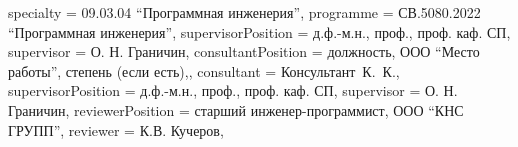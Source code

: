 {    specialty          = {09.03.04 \enquote{Программная инженерия}},
    programme          = {СВ.5080.2022 \enquote{Программная инженерия}},
    supervisorPosition = {д.ф.-м.н., проф., проф. каф. СП},
    supervisor         = {О. Н. Граничин},
    consultantPosition = {должность, ООО \enquote{Место работы}, степень  (если есть),},
    consultant         = {Консультант~К.~К.},
    supervisorPosition = {д.ф.-м.н., проф., проф. каф. СП},
    supervisor         = {О. Н. Граничин},
    reviewerPosition   = {старший инженер-программист, ООО \enquote{КНС ГРУПП}},
    reviewer           = {К.В. Кучеров},
}

